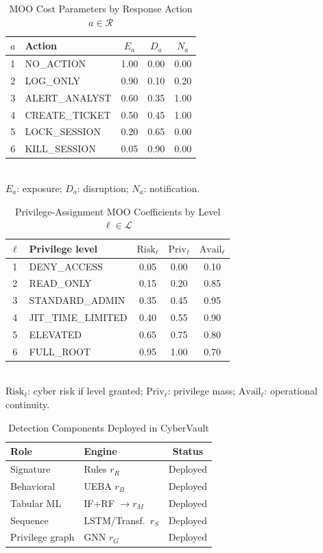 \documentclass{ieeeaccess}
\begin{document}
\begin{table}[!t]
\caption{MOO Cost Parameters by Response Action $a\in\mathcal{R}$}
\label{tab:moo-costs}
\centering
\scriptsize
\begin{tabular}{@{}clccc@{}}
\toprule
$a$ & \textbf{Action} & $E_a$ & $D_a$ & $N_a$ \\
\midrule
1 & NO\_ACTION & 1.00 & 0.00 & 0.00 \\
2 & LOG\_ONLY & 0.90 & 0.10 & 0.20 \\
3 & ALERT\_ANALYST & 0.60 & 0.35 & 1.00 \\
4 & CREATE\_TICKET & 0.50 & 0.45 & 1.00 \\
5 & LOCK\_SESSION & 0.20 & 0.65 & 0.00 \\
6 & KILL\_SESSION & 0.05 & 0.90 & 0.00 \\
\bottomrule
\end{tabular}
\\[0.35em]
{\scriptsize $E_a$: exposure; $D_a$: disruption; $N_a$: notification.}
\end{table}

\begin{table}[!t]
\caption{Privilege-Assignment MOO Coefficients by Level $\ell\in\mathcal{L}$}
\label{tab:priv-moo}
\centering
\scriptsize
\begin{tabular}{@{}clccc@{}}
\toprule
$\ell$ & \textbf{Privilege level} & $\mathrm{Risk}_{\ell}$ & $\mathrm{Priv}_{\ell}$ & $\mathrm{Avail}_{\ell}$ \\
\midrule
1 & DENY\_ACCESS & 0.05 & 0.00 & 0.10 \\
2 & READ\_ONLY & 0.15 & 0.20 & 0.85 \\
3 & STANDARD\_ADMIN & 0.35 & 0.45 & 0.95 \\
4 & JIT\_TIME\_LIMITED & 0.40 & 0.55 & 0.90 \\
5 & ELEVATED & 0.65 & 0.75 & 0.80 \\
6 & FULL\_ROOT & 0.95 & 1.00 & 0.70 \\
\bottomrule
\end{tabular}
\\[0.35em]
{\scriptsize $\mathrm{Risk}_{\ell}$: cyber risk if level granted; $\mathrm{Priv}_{\ell}$: privilege mass; $\mathrm{Avail}_{\ell}$: operational continuity.}
\end{table}

\begin{table}[!t]
\caption{Detection Components Deployed in CyberVault}
\label{tab:deployed-scope}
\centering
\scriptsize
\begin{tabular}{@{}ll c@{}}
\toprule
\textbf{Role} & \textbf{Engine} & \textbf{Status} \\
\midrule
Signature & Rules $r_R$ & Deployed \\
Behavioral & UEBA $r_B$ & Deployed \\
Tabular ML & IF+RF $\rightarrow r_M$ & Deployed \\
Sequence & LSTM/Transf.\ $r_S$ & Deployed \\
Privilege graph & GNN $r_G$ & Deployed \\
\bottomrule
\end{tabular}
\end{table}
\end{document}
